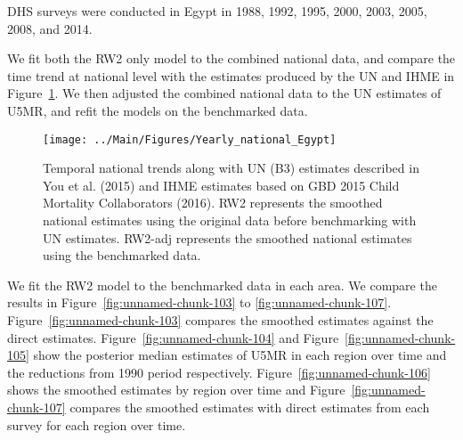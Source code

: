 \documentclass[12pt]{article}\usepackage[]{graphicx}\usepackage[]{color}
\newenvironment{knitrout}{}{} %
\begin{document}


DHS surveys were conducted in Egypt in 1988, 1992, 1995, 2000, 2003, 2005, 2008, and 2014.

We fit both the RW2 only model to the combined national data, and compare the time trend at national level with the estimates produced by the UN and IHME in Figure~\ref{fig:unnamed-chunk-102}. We then adjusted the combined national data to the UN estimates of U5MR, and refit the models on the benchmarked data. 

\begin{knitrout}
\color{fgcolor}\begin{figure}[bht]

{\centering \texttt{[image: ../Main/Figures/Yearly\_national\_Egypt]} 

}

\caption[Temporal national trends along with UN (B3) estimates described in You et al]{Temporal national trends along with UN (B3) estimates described in You et al. (2015) and IHME estimates based on GBD 2015 Child Mortality Collaborators (2016). RW2 represents the smoothed national estimates using the original data before benchmarking with UN estimates. RW2-adj represents the smoothed national estimates using the benchmarked data.}\label{fig:unnamed-chunk-102}
\end{figure}


\end{knitrout}
 

We fit the RW2 model to the benchmarked data in each area. 
We compare the results in Figure~\ref{fig:unnamed-chunk-103} to \ref{fig:unnamed-chunk-107}.
Figure~\ref{fig:unnamed-chunk-103} compares the smoothed estimates against the direct estimates. Figure~\ref{fig:unnamed-chunk-104} and Figure~\ref{fig:unnamed-chunk-105} show the posterior median estimates of U5MR in each region over time and the reductions from 1990 period respectively.
Figure~\ref{fig:unnamed-chunk-106} shows the smoothed estimates by region over time and Figure~\ref{fig:unnamed-chunk-107} compares the smoothed estimates with direct estimates from each survey for each region over time.


\end{document}
